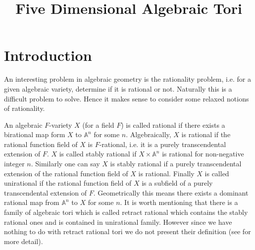 \documentclass[a4paper, 14pt]{extarticle}
\title{Five Dimensional Algebraic Tori}
\theoremstyle{plain}
\theoremstyle{definition}
\begin{document}
\maketitle
{}
  
  
\section{Introduction}
An interesting problem in algebraic geometry is the rationality problem, i.e. 
for a given algebraic variety, determine if it is rational or not. Naturally 
this is a difficult problem to solve. Hence it makes sense to consider some 
relaxed notions of rationality. 

An algebraic $F$-variety $X$ (for a field $F$) is called rational if there exists a birational map 
form $X$ to $\mathbb{A}^n$ for some $n$. Algebraically, $X$ is rational if 
the rational function field of $X$ is $F$-rational, i.e. it is a purely 
transcendental extension of $F$. $X$ is called stably rational if $X \times 
\mathbb{A}^n$ is rational for non-negative integer $n$. Similarly one can say $X$ is stably rational if 
a purely transcendental extension of the rational function field of $X$ is 
rational. Finally $X$ is called unirational if the rational function field of 
$X$ is a subfield of a purely transcendental extension of $F$. Geometrically 
this means there exists a dominant rational map from $\mathbb{A}^n$ to $X$ for
some $n$. It is worth mentioning that there is a family of algebraic tori which is
called retract rational which contains the stably rational ones and is contained in 
unirational family. However since we have nothing to do with retract rational tori we 
do not present their definition (see \cite{Hoshi} for more detail).
\end{document}
